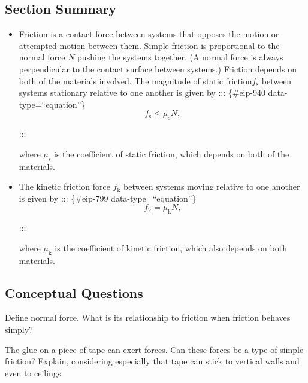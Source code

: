 \documentclass[
]{book}
\begin{document}
\hypertarget{fs-id1388312-summary}{}
\hypertarget{section-summary-14}{%
\subsection{Section Summary}\label{section-summary-14}}

\begin{itemize}
\item
  \protect\hypertarget{import-auto-id1165296328554}{}{Friction is a contact force between systems that opposes the motion
  or attempted motion between them. Simple friction is proportional to
  the normal force \(N{}\) pushing the systems together. (A normal force
  is always perpendicular to the contact surface between systems.)
  Friction depends on both of the materials involved. The magnitude of
  static friction\(f_{\text{s}}{}\) between systems stationary relative
  to one another is given by}
  ::: \{\#eip-940 data-type=``equation''\}
  \[{{{f_{\text{s}} \leq \mu_{\text{s}}}N},}{}\]

  :::

  where \(\mu_{\text{s}}{}\) is the coefficient of static friction,
  which depends on both of the materials.
\item
  \protect\hypertarget{import-auto-id1165298621900}{}{The kinetic friction force \(f_{\text{k}}{}\) between systems moving
  relative to one another is given by}
  ::: \{\#eip-799 data-type=``equation''\}
  \[{{{f_{\text{k}} = \mu_{\text{k}}}N},}{}\]

  :::

  where \(\mu_{\text{k}}{}\) is the coefficient of kinetic friction,
  which also depends on both materials.
\end{itemize}

\hypertarget{fs-id1296538}{}
\hypertarget{conceptual-questions-18}{%
\subsection{Conceptual Questions}\label{conceptual-questions-18}}

\hypertarget{fs-id1320466}{}
\leavevmode{}%
Define normal force. What is its relationship to friction when friction
behaves simply?

\hypertarget{fs-id1748990}{}
\leavevmode{}%
The glue on a piece of tape can exert forces. Can these forces be a type
of simple friction? Explain, considering especially that tape can stick
to vertical walls and even to ceilings.
\end{document}
